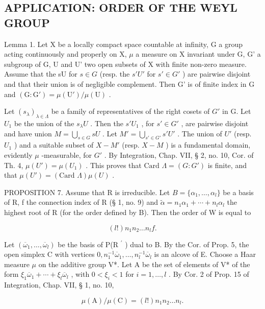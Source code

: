 \subsection{APPLICATION: ORDER OF THE WEYL GROUP}

Lemma 1. Let X be a locally compact space countable at infinity, G a group acting continuously and properly on X, \(\mu\) a measure on X invariant under G, G' a subgroup of G, U and U' two open subsets of X with finite non-zero measure. Assume that the sU for \(s \in G\) (resp. the \(s'U'\) for \(s' \in G'\) ) are pairwise disjoint and that their union is of negligible complement. Then G' is of finite index in G and \((\mathrm{G} : \mathrm{G}') = \mu(\mathrm{U}') / \mu(\mathrm{U})\) .

Let \((s_{\lambda})_{\lambda \in \Lambda}\) be a family of representatives of the right cosets of \(G'\) in G. Let \(U_1\) be the union of the \(s_{\lambda}U\) . Then the \(s'U_1\) , for \(s' \in G'\) , are pairwise disjoint and have union \(M = \bigcup_{s \in G} sU\) . Let \(M' = \bigcup_{s' \in G'} s'U'\) . The union of \(U'\) (resp. \(U_1\) ) and a suitable subset of \(X - M'\) (resp. \(X - M\) ) is a fundamental domain, evidently \(\mu\) -measurable, for \(G'\) . By Integration, Chap. VII, § 2, no. 10, Cor. of Th. 4, \(\mu(U') = \mu(U_1)\) . This proves that \(\text{Card } \Lambda = (G : G')\) is finite, and that \(\mu(U') = (\text{Card } \Lambda)\mu(U)\) .

PROPOSITION 7. Assume that R is irreducible. Let \(B = \{\alpha_{1}, \ldots, \alpha_{l}\}\) be a basis of R, f the connection index of R (§ 1, no. 9) and \(\tilde{\alpha} = n_{1}\alpha_{1} + \cdots + n_{l}\alpha_{l}\) the highest root of R (for the order defined by B). Then the order of W is equal to

\[
(l!) n _ {1} n _ {2} \dots n _ {l} f.
\]

Let \((\overline{\omega}_{1},\ldots,\overline{\omega}_{l})\) be the basis of P(R \(^{\prime}\) ) dual to B. By the Cor. of Prop. 5, the open simplex C with vertices \(0,n_{1}^{-1}\overline{\omega}_{1},\ldots,n_{l}^{-1}\overline{\omega}_{l}\) is an alcove of E. Choose a Haar measure \(\mu\) on the additive group V*. Let A be the set of elements of V* of the form \(\xi_{1}\overline{\omega}_{1}+\cdots+\xi_{l}\overline{\omega}_{l}\) , with \(0<\xi_{i}<1\) for \(i=1,\ldots,l\) . By Cor. 2 of Prop. 15 of Integration, Chap. VII, § 1, no. 10,

\[
\mu (\mathrm{A}) / \mu (\mathrm{C}) = (l!) n _ {1} n _ {2} \dots n _ {l}.\tag{5}
\]

